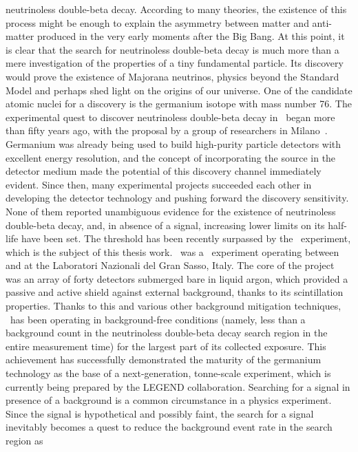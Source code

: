 neutrinoless double-beta decay. According to many theories, the existence of this process
might be enough to explain the asymmetry between matter and anti-matter produced in the
very early moments after the Big Bang. At this point, it is clear that the search for
neutrinoless double-beta decay is much more than a mere investigation of the properties of
a tiny fundamental particle. Its discovery would prove the existence of Majorana
neutrinos, physics beyond the Standard Model and perhaps shed light on the origins of our
universe.
\newpar
{}
One of the candidate atomic nuclei for a discovery is the germanium isotope with mass
number 76. The experimental quest to discover neutrinoless double-beta decay in \gesix\
began more than fifty years ago, with the proposal by a group of researchers in
Milano~\cite{Fiorini1967}.  Germanium was already being used to build high-purity particle
detectors with excellent energy resolution, and the concept of incorporating the source in
the detector medium made the potential of this discovery channel immediately evident.
Since then, many experimental projects succeeded each other in developing the detector
technology and pushing forward the discovery sensitivity. None of them reported
unambiguous evidence for the existence of neutrinoless double-beta decay, and, in absence
of a signal, increasing lower limits on its half-life have been set. The \powtenyr{26}
threshold has been recently surpassed by the \gerda\ experiment, which is the subject of
this thesis work. \gerda\ was a \gesix\ experiment operating between \yr{2008} and
\yr{2019} at the Laboratori Nazionali del Gran Sasso, Italy. The core of the project was
an array of forty detectors submerged bare in liquid argon, which provided a passive and
active shield against external background, thanks to its scintillation properties. Thanks
to this and various other background mitigation techniques, \gerda\ has been operating in
background-free conditions (namely, less than a background count in the neutrinoless
double-beta decay search region in the entire measurement time) for the largest part of
its collected exposure. This achievement has successfully demonstrated the maturity of the
germanium technology as the base of a next-generation, tonne-scale experiment, which is
currently being prepared by the LEGEND collaboration.
\newpar
Searching for a signal in presence of a background is a common circumstance in a physics
experiment. Since the signal is hypothetical and possibly faint, the search for a signal
inevitably becomes a quest to reduce the background event rate in the search region as

